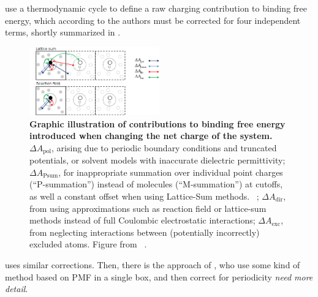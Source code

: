 \documentclass[10pt,final]{article}
\begin{document}
\textcite{Reif2013a} use a thermodynamic cycle to define a raw charging contribution to binding free energy,
which according to the authors must be corrected for four independent terms, shortly summarized in .
\begin{figure}[H]
  \centering
  \includegraphics[width=0.5\textwidth]{figures/reif_oostenbrink.png}
    \caption{\textbf{Graphic illustration of contributions to binding free energy introduced when changing the net charge of the system.}  $\Delta A_\mathrm{pol}$, arising due to periodic boundary conditions and truncated potentials, or solvent models with inaccurate dielectric permittivity; $\Delta A_\mathrm{Psum}$, for inappropriate summation over individual point charges (``P-summation'') instead of molecules (``M-summation'') at cutoffs, as well a constant offset when using Lattice-Sum methods.~\cite{Kastenholz2006a} ; $\Delta A_\mathrm{dir}$, from using approximations such as reaction field or lattice-sum methods instead of full Coulombic electrostatic interactions; $\Delta A_\mathrm{exc}$, from neglecting interactions between (potentially incorrectly) excluded atoms. Figure from ~\textcite{Reif2013a}.}
  \label{figure:chargecorrections}
\end{figure}

\textcite{Rocklin2013a} uses similar corrections.
Then, there is the approach of \textcite{Lin2014a}, who use some kind of method based on PMF in a single box, and then correct for periodicity \emph{need more detail}. 
\end{document}
